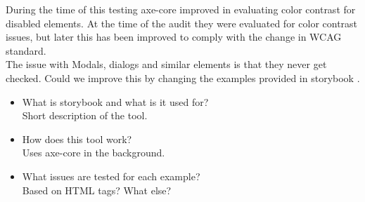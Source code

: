 \documentclass{master_thesis}
\begin{document}
During the time of this testing axe-core improved in evaluating color contrast for disabled elements. At the time of the audit they were evaluated for color contrast issues, but later this has been improved to comply with the change in WCAG standard.\\

The issue with Modals, dialogs and similar elements is that they never get checked. Could we improve this by changing the examples provided in storybook \cite{DequeSystems2021}.
\begin{itemize}
	\item What is storybook and what is it used for?\\
	Short description of the tool.
	\item How does this tool work?\\
	Uses axe-core in the background.
	\item What issues are tested for each example? \\
	Based on HTML tags? What else?
\end{itemize}
\end{document}

